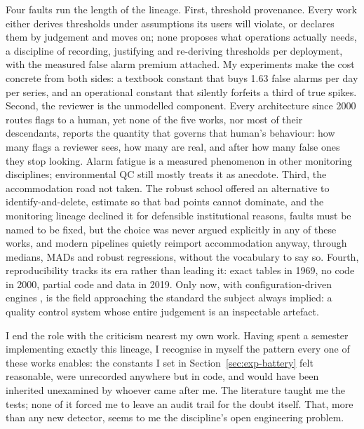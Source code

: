 Four faults run the length of the lineage. First, threshold provenance. Every
work either derives thresholds under assumptions its users will violate, or
declares them by judgement and moves on; none proposes what operations
actually needs, a discipline of recording, justifying and re-deriving
thresholds per deployment, with the measured false alarm premium attached.
My experiments make the cost concrete from both sides: a textbook constant
that buys 1.63 false alarms per day per series, and an operational constant
that silently forfeits a third of true spikes. Second, the reviewer is the
unmodelled component. Every architecture since 2000 routes flags to a human,
yet none of the five works, nor most of their descendants, reports the
quantity that governs that human's behaviour: how many flags a reviewer
sees, how many are real, and after how many false ones they stop looking.
Alarm fatigue is a measured phenomenon in other monitoring disciplines;
environmental QC still mostly treats it as anecdote. Third, the
accommodation road not taken. The robust school offered an alternative to
identify-and-delete, estimate so that bad points cannot dominate, and the
monitoring lineage declined it for defensible institutional reasons, faults
must be named to be fixed, but the choice was never argued explicitly in any
of these works, and modern pipelines quietly reimport accommodation anyway,
through medians, MADs and robust regressions, without the vocabulary to say
so. Fourth, reproducibility tracks its era rather than leading it: exact
tables in 1969, no code in 2000, partial code and data in 2019. Only now,
with configuration-driven engines \citep{schmidt2023}, is the field
approaching the standard the subject always implied: a quality control
system whose entire judgement is an inspectable artefact.

I end the role with the criticism nearest my own work. Having spent a
semester implementing exactly this lineage, I recognise in myself the
pattern every one of these works enables: the constants I set in
Section~\ref{sec:exp-battery} felt reasonable, were unrecorded anywhere but
in code, and would have been inherited unexamined by whoever came after me.
The literature taught me the tests; none of it forced me to leave an audit
trail for the doubt itself. That, more than any new detector, seems to me
the discipline's open engineering problem.

